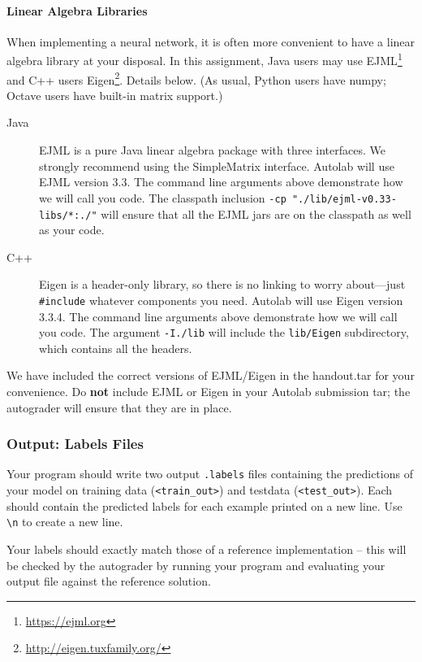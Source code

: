 \documentclass[11pt]{article}
\numberwithin{equation}{section} %
\numberwithin{figure}{section} %
\numberwithin{table}{section} %
\newcommand{\ntset}{test}
\begin{document}
\begin{notebox}
\paragraph{Linear Algebra Libraries} When implementing a neural network, it is often more convenient to have a linear algebra library at your disposal. In this assignment, Java users may use EJML\footnote{\url{https://ejml.org}} and C++ users Eigen\footnote{\url{http://eigen.tuxfamily.org/}}. Details below. 
%
(As usual, Python users have numpy; Octave users have built-in matrix support.)
%
\begin{description}
\item[Java] EJML is a pure Java linear algebra package with three interfaces. We strongly recommend using the SimpleMatrix interface. Autolab will use EJML version 3.3. The command line arguments above demonstrate how we will call you code. The classpath inclusion \lstinline{-cp "./lib/ejml-v0.33-libs/*:./"} will ensure that all the EJML jars are on the classpath as well as your code. 
\item[C++] Eigen is a header-only library, so there is no linking to worry about---just \lstinline{#include} whatever components you need. Autolab will use Eigen version 3.3.4. The command line arguments above demonstrate how we will call you code. The argument \lstinline{-I./lib} will include the \lstinline{lib/Eigen} subdirectory, which contains all the headers.
\end{description} 
We have included the correct versions of EJML/Eigen in the handout.tar for your convenience. Do {\bf not} include EJML or Eigen in your Autolab submission tar; the autograder will ensure that they are in place. 
\end{notebox}

\subsubsection{Output: Labels Files} \label{output}
Your program should write two output \texttt{.labels} files containing the predictions of your model on training data (\texttt{<train\_out>}) and \ntset\thinspace data (\texttt{<\ntset\_out>}). Each should contain the predicted labels for each example printed on a new line. Use \lstinline{\n} to create a new line. 

Your labels should exactly match those of a reference implementation -- this will be checked by the autograder by running your program and evaluating your output file against the reference solution.
\end{document}
